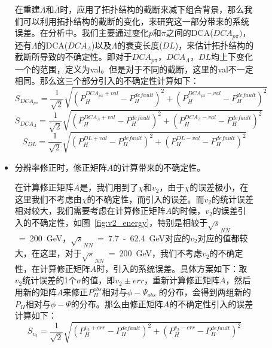 \begin{figure}[htbp]
\begin{itemize}
在重建$\Lambda$和$\bar{\Lambda}$时，应用了拓扑结构的截断来减下组合背景，那么我们可以利用拓扑结构的截断的变化，来研究这一部分带来的系统误差。在分析中。我们主要通过变化$p$和$\pi$之间的DCA($DCA_{p\pi})$，还有$\Lambda$的DCA($DCA_{\Lambda}$)以及$\Lambda$的衰变长度($DL$)，来估计拓扑结构的截断所导致的不确定性。即对于$DCA_{p\pi}$，$DCA_{\Lambda}$，$DL$均上下变化一个的范围，定义为val。但是对于不同的截断，这里的val不一定相同。那么这三个部分引入的不确定性计算如下：
\begin{equation}
S_{DCA_{p\pi}} = \frac{1}{\sqrt{2}} \sqrt{(P_{H}^{DCA_{p\pi}+val} - P_{H}^{default})^2 + (P_{H}^{DCA_{p\pi}-val} - P_{H}^{default})^2}
\label{eq:sys_1}
\end{equation}
\begin{equation}
S_{DCA_{\Lambda}} = \frac{1}{\sqrt{2}} \sqrt{(P_{H}^{DCA_{\Lambda}+val} - P_{H}^{default})^2 + (P_{H}^{DCA_{\Lambda}-val} - P_{H}^{default})^2}
\label{eq:sys_2}
\end{equation}
\begin{equation}
S_{DL} = \frac{1}{\sqrt{2}} \sqrt{(P_{H}^{DL+val} - P_{H}^{default})^2 + (P_{H}^{DL-val} - P_{H}^{default})^2}
\label{eq:sys_3}
\end{equation}

\item 分辨率修正时，修正矩阵$A$的计算带来的不确定性。

在计算修正矩阵$A$是，我们用到了$\chi$和$v_{2}$，由于$\chi$的误差极小，在这里我们不考虑由$\chi$的不确定性，而引入的误差。而$v_{2}$的统计误差相对较大，我们需要考虑在计算修正矩阵$A$的时候，$v_{2}$的误差引入的不确定性，如图~\ref{fig:v2_energy}，特别是相较于$\sqrt{s}_{NN}$~=~200~GeV，$\sqrt{s}_{NN}$~=~7.7~-~62.4~GeV对应的$v_{2}$对应的值都较大，在这里，对于$\sqrt{s}_{NN}$~=~200~GeV，我们不考虑$v_{2}$的不确定性，在计算修正矩阵$A$时，引入的系统误差。具体方案如下：取$v_{2}$统计误差的1个$\sigma$的值，即$v_{2} \pm err$，重新计算修正矩阵$A$，然后用新的矩阵$A$来修正$P^{obs}_{H}$相对与$\phi-\Psi_{obs}$ 的分布，会得到两组新的$P_{H}$相对与$\phi-\Psi$的分布。那么由修正矩阵$A$的不确定性引入的误差计算如下：
\begin{equation}
S_{v_{2}} = \frac{1}{\sqrt{2}} \sqrt{(P_{H}^{v_{2}+err} - P_{H}^{default})^2 + (P_{H}^{v_{2}-err} - P_{H}^{default})^2}
\label{eq:sys_4}
\end{equation}
\end{itemize}


\end{figure}
